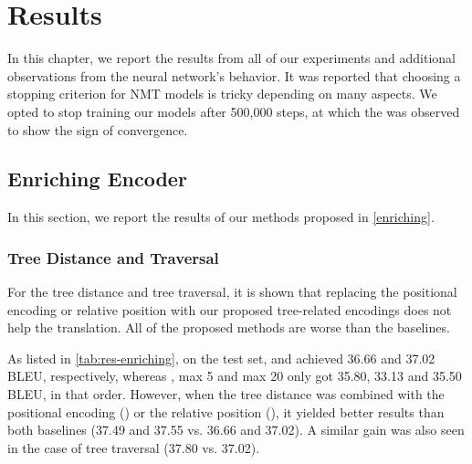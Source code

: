 \chapter{Results}
\label{result}

In this chapter, we report the results from all of our experiments and additional observations from the neural network's behavior.
It was reported that choosing a stopping criterion for NMT models is tricky \citep{TrainingTipsfortheTransformerModel} depending on many aspects.
We opted to stop training our models after 500,000 steps, at which the \transformerbase was observed to show the sign of convergence.

\section{Enriching Encoder}
\label{result-enriching}

In this section, we report the results of our methods proposed in \cref{enriching}.

\subsection{Tree Distance and Traversal}

For the tree distance and tree traversal, it is shown that replacing the positional encoding or relative position with our proposed tree-related encodings does not help the translation.
All of the proposed methods are worse than the baselines.

As listed in \cref{tab:res-enriching}, on the test set, \transformerbase and \transformerrel achieved 36.66 and 37.02 BLEU, respectively, whereas \TreeTraversal, \TreeDistance max 5 and max 20 only got 35.80, 33.13 and 35.50 BLEU, in that order.
However, when the tree distance was combined with the positional encoding (\transformerbase) or the relative position (\transformerrel), it yielded better results than both baselines (37.49 and 37.55 vs. 36.66 and 37.02).
A similar gain was also seen in the case of tree traversal (37.80 vs. 37.02).

